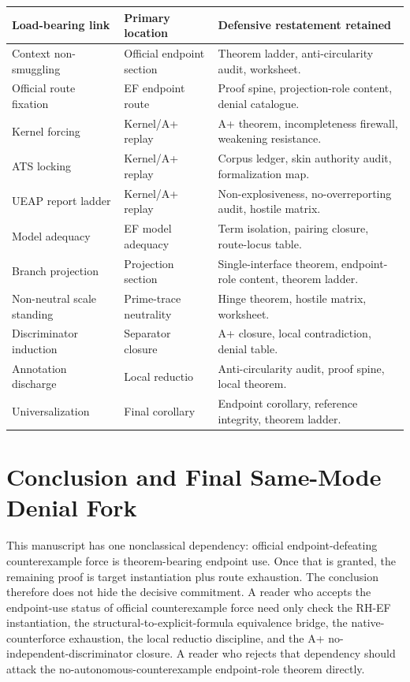 \documentclass[11pt]{article}
\begin{document}
\begingroup\small
\begin{longtable}{L{0.29\textwidth}L{0.22\textwidth}L{0.39\textwidth}}
\toprule
\textbf{Load-bearing link} & \textbf{Primary location} & \textbf{Defensive restatement retained}\\
\midrule
Context non-smuggling & Official endpoint section & Theorem ladder, anti-circularity audit, worksheet.\\
Official route fixation & EF endpoint route & Proof spine, projection-role content, denial catalogue.\\
Kernel forcing & Kernel/A+ replay & A+ theorem, incompleteness firewall, weakening resistance.\\
ATS locking & Kernel/A+ replay & Corpus ledger, skin authority audit, formalization map.\\
UEAP report ladder & Kernel/A+ replay & Non-explosiveness, no-overreporting audit, hostile matrix.\\
Model adequacy & EF model adequacy & Term isolation, pairing closure, route-locus table.\\
Branch projection & Projection section & Single-interface theorem, endpoint-role content, theorem ladder.\\
Non-neutral scale standing & Prime-trace neutrality & Hinge theorem, hostile matrix, worksheet.\\
Discriminator induction & Separator closure & A+ closure, local contradiction, denial table.\\
Annotation discharge & Local reductio & Anti-circularity audit, proof spine, local theorem.\\
Universalization & Final corollary & Endpoint corollary, reference integrity, theorem ladder.\\
\bottomrule
\end{longtable}
\endgroup

\section{Conclusion and Final Same-Mode Denial Fork}

This manuscript has one nonclassical dependency: official endpoint-defeating counterexample force is theorem-bearing endpoint use.  Once that is granted, the remaining proof is target instantiation plus route exhaustion.  The conclusion therefore does not hide the decisive commitment.  A reader who accepts the endpoint-use status of official counterexample force need only check the RH-EF instantiation, the structural-to-explicit-formula equivalence bridge, the native-counterforce exhaustion, the local reductio discipline, and the A+ no-independent-discriminator closure.  A reader who rejects that dependency should attack the no-autonomous-counterexample endpoint-role theorem directly.
\end{document}
